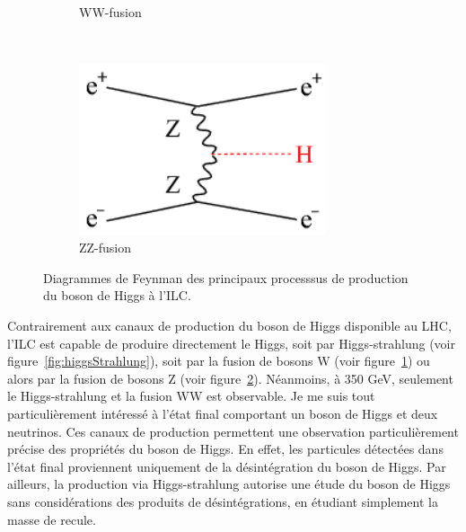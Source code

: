 \documentclass[a4papper, 10pt]{article}
\begin{document}
\begin{figure}
\begin{subfigure}[t]{0.3\textwidth}
            \caption{WW-fusion}
            \label{fig:WW-fusion}
        \end{subfigure}
        ~%
        \begin{subfigure}[t]{0.3\textwidth}
            \includegraphics[width = 0.8\textwidth]{Pictures/HiggsProd_eeH.png}
            \caption{ZZ-fusion}
            \label{fig:ZZ-fusion}
        \end{subfigure}
        \caption{Diagrammes de Feynman des principaux processsus de production du boson de Higgs à l'ILC\cite{Asner2013}\cite{tian}.}
        \label{fig:higgsProduction}
    \end{figure}    

  Contrairement aux canaux de production du boson de Higgs disponible au LHC, l'ILC est capable de produire directement le Higgs, soit par Higgs-strahlung (voir figure~\ref{fig:higgsStrahlung}), soit par la fusion de bosons W (voir figure~\ref{fig:WW-fusion}) ou alors par la fusion de bosons Z (voir figure~\ref{fig:ZZ-fusion}).
  Néanmoins, à 350 GeV, seulement le Higgs-strahlung et la fusion WW est observable.
  Je me suis tout particulièrement intéressé à l'état final comportant un boson de Higgs et deux neutrinos.
  Ces canaux de production permettent une observation particulièrement précise des propriétés du boson de Higgs. 
  En effet, les particules détectées dans l'état final proviennent uniquement de la désintégration du boson de Higgs. 
  Par ailleurs, la production via Higgs-strahlung autorise une étude du boson de Higgs sans considérations des produits de désintégrations, en étudiant simplement la masse de recule.
  
\end{document}

